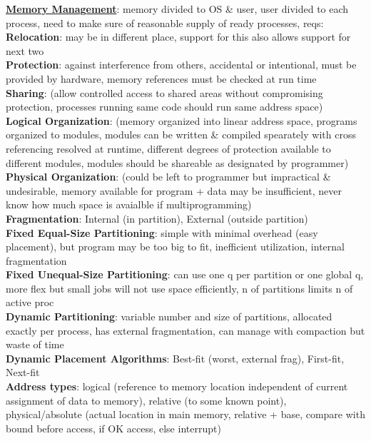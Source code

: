 \documentclass[a4paper]{article}
\begin{document}
\begin{multicols}{2}
        \underline{\textbf{Memory Management}}: memory divided to OS \& user, user divided to each process, need to make sure of reasonable supply of ready processes, reqs:\\
        \textbf{Relocation}: may be in different place, support for this also allows support for next two\\
        \textbf{Protection}: against interference from others, accidental or intentional, must be provided by hardware, memory references must be checked at run time\\
        \textbf{Sharing}: (allow controlled access to shared areas without compromising protection, processes running same code should run same address space)\\
        \textbf{Logical Organization}: (memory organized into linear address space, programs organized to modules, modules can be written \& compiled spearately with cross referencing resolved at runtime, different degrees of protection available to different modules, modules should be shareable as designated by programmer)\\
        \textbf{Physical Organization}: (could be left to programmer but impractical \& undesirable, memory available for program + data may be insufficient, never know how much space is avaialble if multiprogramming)\\
        \textbf{Fragmentation}: Internal (in partition), External (outside partition)\\
        \textbf{Fixed Equal-Size Partitioning}: simple with minimal overhead (easy placement), but program may be too big to fit, inefficient utilization, internal fragmentation\\
        \textbf{Fixed Unequal-Size Partitioning}: can use one q per partition or one global q, more flex but small jobs will not use space efficiently, n of partitions limits n of active proc\\
        \textbf{Dynamic Partitioning}: variable number and size of partitions, allocated exactly per process, has external fragmentation, can manage with compaction but waste of time\\
        \textbf{Dynamic Placement Algorithms}: Best-fit (worst, external frag), First-fit, Next-fit\\
        \textbf{Address types}: logical (reference to memory location independent of current assignment of data to memory), relative (to some known point), physical/absolute (actual location in main memory, relative + base, compare with bound before access, if OK access, else interrupt)\\

\end{multicols}
\end{document}
